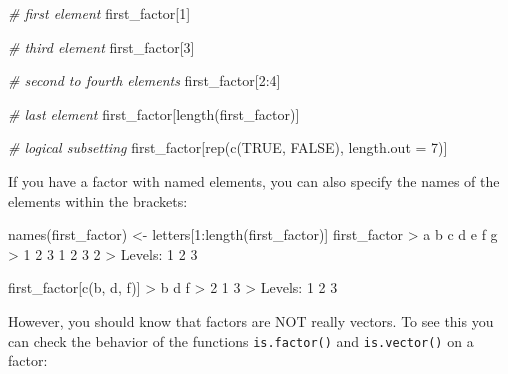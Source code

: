 \documentclass[
]{book}
\newenvironment{Shaded}{\begin{snugshade}}{\end{snugshade}}
\newcommand{\AttributeTok}[1]{\textcolor[rgb]{0.77,0.63,0.00}{#1}}
\newcommand{\CommentTok}[1]{\textcolor[rgb]{0.56,0.35,0.01}{\textit{#1}}}
\newcommand{\ConstantTok}[1]{\textcolor[rgb]{0.00,0.00,0.00}{#1}}
\newcommand{\DecValTok}[1]{\textcolor[rgb]{0.00,0.00,0.81}{#1}}
\newcommand{\FunctionTok}[1]{\textcolor[rgb]{0.00,0.00,0.00}{#1}}
\newcommand{\NormalTok}[1]{#1}
\newcommand{\OtherTok}[1]{\textcolor[rgb]{0.56,0.35,0.01}{#1}}
\newcommand{\SpecialCharTok}[1]{\textcolor[rgb]{0.00,0.00,0.00}{#1}}
\newcommand{\StringTok}[1]{\textcolor[rgb]{0.31,0.60,0.02}{#1}}
\begin{document}
\begin{Shaded}
\begin{Highlighting}[]
\CommentTok{\# first element}
\NormalTok{first\_factor[}\DecValTok{1}\NormalTok{]}

\CommentTok{\# third element}
\NormalTok{first\_factor[}\DecValTok{3}\NormalTok{]}

\CommentTok{\# second to fourth elements}
\NormalTok{first\_factor[}\DecValTok{2}\SpecialCharTok{:}\DecValTok{4}\NormalTok{]}

\CommentTok{\# last element}
\NormalTok{first\_factor[}\FunctionTok{length}\NormalTok{(first\_factor)]}

\CommentTok{\# logical subsetting}
\NormalTok{first\_factor[}\FunctionTok{rep}\NormalTok{(}\FunctionTok{c}\NormalTok{(}\ConstantTok{TRUE}\NormalTok{, }\ConstantTok{FALSE}\NormalTok{), }\AttributeTok{length.out =} \DecValTok{7}\NormalTok{)]}
\end{Highlighting}
\end{Shaded}

If you have a factor with named elements, you can also specify the names of
the elements within the brackets:

\begin{Shaded}
\begin{Highlighting}[]
\FunctionTok{names}\NormalTok{(first\_factor) }\OtherTok{\textless{}{-}}\NormalTok{ letters[}\DecValTok{1}\SpecialCharTok{:}\FunctionTok{length}\NormalTok{(first\_factor)]}
\NormalTok{first\_factor}
\SpecialCharTok{\textgreater{}}\NormalTok{ a b c d e f g }
\SpecialCharTok{\textgreater{}} \DecValTok{1} \DecValTok{2} \DecValTok{3} \DecValTok{1} \DecValTok{2} \DecValTok{3} \DecValTok{2} 
\SpecialCharTok{\textgreater{}}\NormalTok{ Levels}\SpecialCharTok{:} \DecValTok{1} \DecValTok{2} \DecValTok{3}

\NormalTok{first\_factor[}\FunctionTok{c}\NormalTok{(}\StringTok{\textquotesingle{}b\textquotesingle{}}\NormalTok{, }\StringTok{\textquotesingle{}d\textquotesingle{}}\NormalTok{, }\StringTok{\textquotesingle{}f\textquotesingle{}}\NormalTok{)]}
\SpecialCharTok{\textgreater{}}\NormalTok{ b d f }
\SpecialCharTok{\textgreater{}} \DecValTok{2} \DecValTok{1} \DecValTok{3} 
\SpecialCharTok{\textgreater{}}\NormalTok{ Levels}\SpecialCharTok{:} \DecValTok{1} \DecValTok{2} \DecValTok{3}
\end{Highlighting}
\end{Shaded}

However, you should know that factors are NOT really vectors. To see this you
can check the behavior of the functions \texttt{is.factor()} and \texttt{is.vector()} on a
factor:
\end{document}

